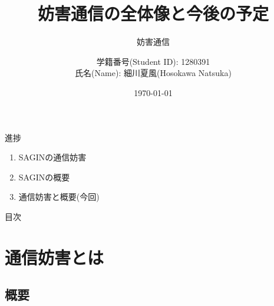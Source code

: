 \documentclass[11pt, aspectratio=169]{beamer}
\title{妨害通信の全体像と今後の予定}
\subtitle{妨害通信}
\author{学籍番号(Student ID): 1280391 \\ 氏名(Name): 細川夏風(Hosokawa Natsuka)}
\institute{高知工科大学(Kochi Univ of Tech)}
\date{\today}
\begin{document}
\usetikzlibrary{decorations.pathmorphing}

\begin{frame}
  \titlepage
\end{frame}

\begin{frame}{進捗}
  \begin{enumerate}[1]
    \item SAGINの通信妨害
    \item SAGINの概要
    \item 通信妨害と概要(今回)
  \end{enumerate}
\end{frame}

\begin{frame}{目次}
  \tableofcontents
\end{frame}


\section{通信妨害とは}
\subsection{概要}

\end{document}

